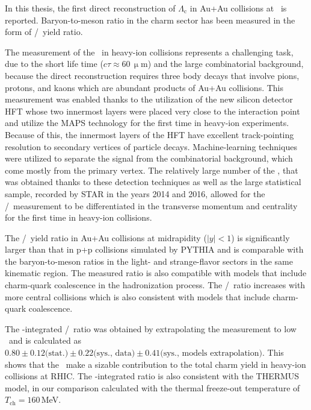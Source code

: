 In this thesis, the first direct reconstruction of $\Lambda_\mathrm{c}$ in Au+Au collisions at \snnFull\ is reported. Baryon-to-meson ratio in the charm sector has been measured in the form of \Lambdac/\dzero\ yield ratio. 

The measurement of the \Lambdac\ in heavy-ion collisions represents a challenging task, due to the short life time ($c\tau \approx 60\,\upmu$m) and the large combinatorial background, because the direct reconstruction requires three body decays that involve pions, protons, and kaons which are abundant products of Au+Au collisions. This measurement was enabled thanks to the utilization of the new silicon detector HFT whose two innermost layers were placed very close to the interaction point and utilize the MAPS technology for the first time in heavy-ion experiments\@. Because of this, the innermost layers of the HFT have excellent track-pointing resolution to secondary vertices of particle decays. Machine-learning techniques were utilized to separate the signal from the combinatorial background, which come mostly from the primary vertex. The relatively large number of the \Lambdac, that was obtained thanks to these detection techniques as well as the large statistical sample, recorded by STAR in the years 2014 and 2016, allowed for the \Lambdac/\dzero\ measurement to be differentiated in the transverse momentum and centrality for the first time in heavy-ion collisions.

The \Lambdac/\dzero\ yield ratio in Au+Au collisions at midrapidity ($|y| < 1$) is significantly larger than that in p+p collisions simulated by PYTHIA and is comparable with the baryon-to-meson ratios in the light- and strange-flavor sectors in the same kinematic region. The measured ratio is also compatible with models that include charm-quark coalescence in the hadronization process.
The \Lambdac/\dzero\ ratio increases with more central collisions which is also consistent with models that include charm-quark coalescence.

The \pt-integrated \Lambdac/\dzero\ ratio was obtained by extrapolating the measurement to low \pt\ and is calculated as $0.80\pm0.12\text{(stat.)}\pm0.22\text{(sys., data)}\pm0.41\text{(sys., models extrapolation)}$\@. This shows that the \Lambdac\ make a sizable contribution to the total charm yield in heavy-ion collisions at RHIC. The \pt-integrated ratio is also consistent with the THERMUS model, in our comparison calculated with the thermal freeze-out temperature of $T_\mathrm{ch} = 160\,$MeV\@.


